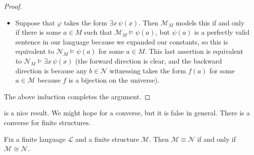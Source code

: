 \documentclass[../notes.tex]{subfiles}
\begin{document}
\begin{proof}
\begin{itemize}
		\item Suppose that $\varphi$ takes the form $\exists x\,\psi(x)$. Then $\mathcal M_M$ models this if and only if there is some $a\in M$ such that $\mathcal M_M\models\psi(a)$, but $\psi(a)$ is a perfectly valid sentence in our language because we expanded our constants, so this is equivalent to $\mathcal N_M\models\psi(a)$ for some $a\in M$. This last assertion is equivalent to $\mathcal N_M\models\exists x\,\psi(x)$ (the forward direction is clear, and the backward direction is because any $b\in\mathcal N$ witnessing takes the form $f(a)$ for some $a\in\mathcal M$ because $f$ is a bijection on the universe).
	\end{itemize}
	The above induction completes the argument.
\end{proof}
 is a nice result. We might hope for a converse, but it is false in general. There is a converse for finite structures.
\begin{proposition}
	Fix a finite language $\mathcal L$ and a finite structure $\mathcal M$. Then $\mathcal M\equiv\mathcal N$ if and only if $\mathcal M\cong\mathcal N$.
\end{proposition}
\end{document}
